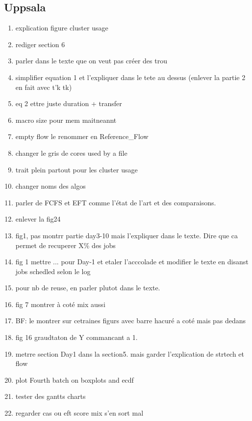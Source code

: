 \documentclass[a4paper]{article}
\begin{document}
	\subsection{Uppsala}
		\begin{enumerate}
			\item explication figure cluster usage
			\item rediger section 6
			\item parler dans le texte que on veut pas créer des trou
			\item simplifier equation 1 et l'expliquer dans le tete au dessus (enlever la partie 2 en fait avec t'k tk)
			\item eq 2 ettre juste duration + transfer
			\item macro size pour mem maitneannt
			\item empty flow le renommer en Reference_Flow
			\item changer le gris de cores used by a file
			\item trait plein partout pour les cluster usage
			\item changer noms des algos
			\item parler de FCFS et EFT comme l'état de l'art et des comparaisons.
			\item enlever la fig24
			\item fig1, pas montrr partie day3-10 mais l'expliquer dans le texte. Dire que ca permet de recuperer X\% des jobs
			\item fig 1 mettre ... pour Day-1 et etaler l'acccolade et modifier le texte en disanst jobs schedled selon le log
			\item pour nb de reuse, en parler plutot dans le texte.
			\item fig 7 montrer à coté mix aussi
			\item BF: le montrer sur cetraines figurs avec barre hacuré a coté mais pas dedans
			\item fig 16 graudtaton de Y commancant a 1.
			\item metrre section Day1 dans la section5. mais garder l'explication de strtech et flow
			\item plot Fourth batch on boxplots and ecdf
			\item tester des gantts charts
			\item regarder cas ou eft score mix s'en sort mal
			
			
			

\end{enumerate}
\end{document}
